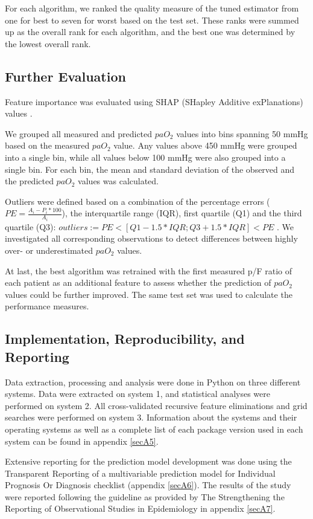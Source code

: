 \documentclass[referee,lineno,pdflatex,sn-nature]{sn-jnl}%
\theoremstyle{thmstyleone}%
\theoremstyle{thmstyletwo}%
\theoremstyle{thmstylethree}%
\begin{document}
For each algorithm, we ranked the quality measure of the tuned estimator from one for best to seven for worst based on the test set. These ranks were summed up as the overall rank for each algorithm, and the best one was determined by the lowest overall rank. 

\subsection{Further Evaluation}
Feature importance was evaluated using SHAP (SHapley Additive exPlanations) values \cite{Lundberg2017,Shapley1953}. 

We grouped all measured and predicted $paO_2$ values into bins spanning 50 mmHg based on the measured $paO_2$ value. Any values above 450 mmHg were grouped into a single bin, while all values below 100 mmHg were also grouped into a single bin. For each bin, the mean and standard deviation of the observed and the predicted $paO_2$ values was calculated. 

Outliers were defined based on a combination of the percentage errors ($PE=\frac{A_i-P_i*100}{A_i}$), the interquartile range (IQR), first quartile (Q1) and the third quartile (Q3): $outliers:=PE<[Q1-1.5*IQR; Q3+1.5*IQR]<PE$ \cite{Beniger1978}. We investigated all corresponding observations to detect differences between highly over- or underestimated $paO_2$ values. 

At last, the best algorithm was retrained with the first measured p/F ratio of each patient as an additional feature to assess whether the prediction of $paO_2$ values could be further improved. The same test set was used to calculate the performance measures.

\subsection{Implementation, Reproducibility, and Reporting}\label{sec2.6}
Data extraction, processing and analysis were done in Python on three different systems. Data were extracted on system 1, and statistical analyses were performed on system 2. All cross-validated recursive feature eliminations and grid searches were performed on system 3. Information about the systems and their operating systems as well as a complete list of each package version used in each system can be found in appendix \ref{secA5}. 

Extensive reporting for the prediction model development was done using the Transparent Reporting of a multivariable prediction model for Individual Prognosis Or Diagnosis checklist (appendix \ref{secA6}). The results of the study were reported following the guideline as provided by The Strengthening the Reporting of Observational Studies in Epidemiology in appendix \ref{secA7}.
\end{document}
